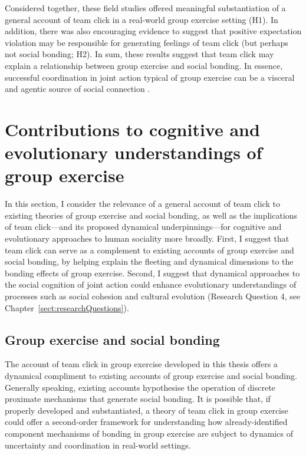 Considered together, these field studies offered meaningful substantiation of a general account of team click in a real-world group exercise setting (H1).  In addition, there was also encouraging evidence to suggest that positive expectation violation may be responsible for generating feelings of team click (but perhaps not social bonding; H2).  In sum, these results suggest that team click may explain a relationship between group exercise and social bonding.  In essence, successful coordination in joint action typical of group exercise can be a visceral and agentic source of social connection \citep{Marsh2009}.








  \section{Contributions to cognitive and evolutionary understandings of group exercise}
In this section, I consider the relevance of a general account of team click to existing theories of group exercise and social bonding, as well as the implications of team click---and its proposed dynamical underpinnings---for cognitive and evolutionary approaches to human sociality more broadly.  First, I suggest that team click can serve as a complement to existing accounts of group exercise and social bonding, by helping explain the fleeting and dynamical dimensions to the bonding effects of group exercise.  Second, I suggest that dynamical approaches to the social cognition of joint action could enhance evolutionary understandings of processes such as social cohesion and cultural evolution (Research Question 4, see Chapter~\ref{sect:researchQuestions}).


  \subsection{Group exercise and social bonding}
The account of team click in group exercise developed in this thesis offers a dynamical compliment to existing accounts of group exercise and social bonding.  Generally speaking, existing accounts hypothesise the operation of discrete proximate mechanisms that generate social bonding.  It is possible that,  if properly developed and substantiated, a theory of team click in group exercise could offer a second-order framework for understanding how already-identified component mechanisms of bonding in group exercise are subject to dynamics of uncertainty and coordination in real-world settings.

